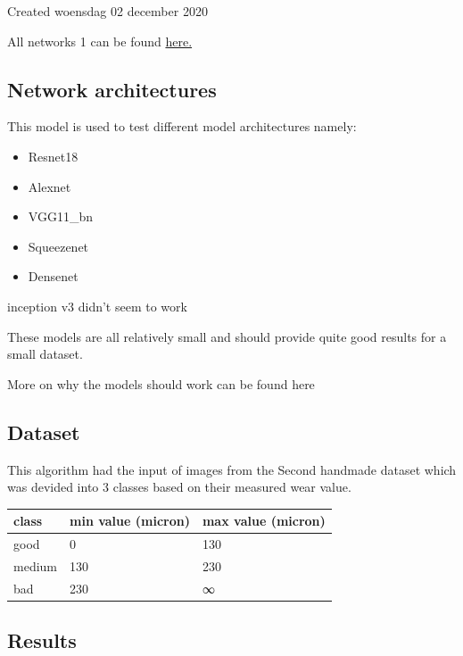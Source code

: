 Created woensdag 02 december 2020



All networks 1 can be found \href{https://colab.research.google.com/drive/1bWt0DgypiYoOOgnSGjlmSdDo7elvJnH4}{here.}



\subsection{Network architectures}

This model is used to test different model architectures namely:

\begin{itemize}
\item Resnet18
\item Alexnet
\item VGG11\_bn
\item Squeezenet
\item Densenet
\end{itemize}


inception v3 didn't seem to work



These models are all relatively small and should provide quite good results for a small dataset. 

More on why the models should work can be found here



\subsection{Dataset}



This algorithm had the input of images from the Second handmade dataset which was devided into 3 classes based on their measured wear value. 

\begin{tabular}{ |l|l|l| }
\hline
 class & min value (micron) & max value (micron) \tabularnewline
\hline
\hline
 good & 0 & 130 \tabularnewline
\hline
 medium & 130 & 230 \tabularnewline
\hline
 bad & 230 & ∞ \tabularnewline
\hline
\end{tabular}










\subsection{Results}

